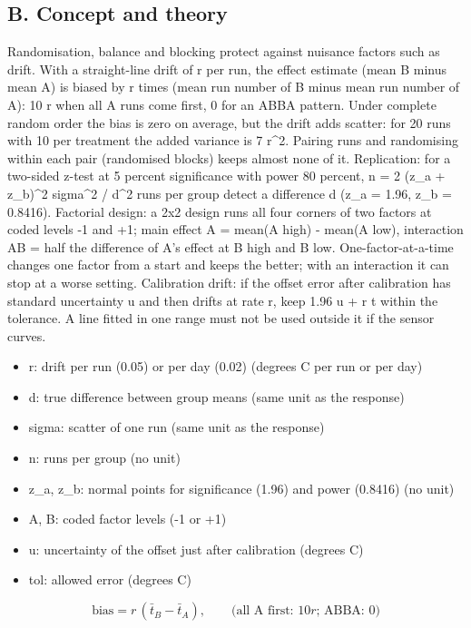 \documentclass[11pt,a4paper]{article}
\begin{document}
\subsection*{B. Concept and theory}
Randomisation, balance and blocking protect against nuisance factors such as drift. With a straight-line drift of r per run, the effect estimate (mean B minus mean A) is biased by r times (mean run number of B minus mean run number of A): 10 r when all A runs come first, 0 for an ABBA pattern. Under complete random order the bias is zero on average, but the drift adds scatter: for 20 runs with 10 per treatment the added variance is 7 r\textasciicircum{}2. Pairing runs and randomising within each pair (randomised blocks) keeps almost none of it. Replication: for a two-sided z-test at 5 percent significance with power 80 percent, n = 2 (z\_a + z\_b)\textasciicircum{}2 sigma\textasciicircum{}2 / d\textasciicircum{}2 runs per group detect a difference d (z\_a = 1.96, z\_b = 0.8416). Factorial design: a 2x2 design runs all four corners of two factors at coded levels -1 and +1; main effect A = mean(A high) - mean(A low), interaction AB = half the difference of A's effect at B high and B low. One-factor-at-a-time changes one factor from a start and keeps the better; with an interaction it can stop at a worse setting. Calibration drift: if the offset error after calibration has standard uncertainty u and then drifts at rate r, keep 1.96 u + r t within the tolerance. A line fitted in one range must not be used outside it if the sensor curves.

\begin{itemize}[nosep]
\item r: drift per run (0.05) or per day (0.02) (degrees C per run or per day)
\item d: true difference between group means (same unit as the response)
\item sigma: scatter of one run (same unit as the response)
\item n: runs per group (no unit)
\item z\_a, z\_b: normal points for significance (1.96) and power (0.8416) (no unit)
\item A, B: coded factor levels (-1 or +1)
\item u: uncertainty of the offset just after calibration (degrees C)
\item tol: allowed error (degrees C)
\end{itemize}

\begin{equation*}
\text{bias}=r\,(\bar t_B-\bar t_A),\qquad \text{(all A first: } 10r\text{; ABBA: } 0)
\end{equation*}
\end{document}
